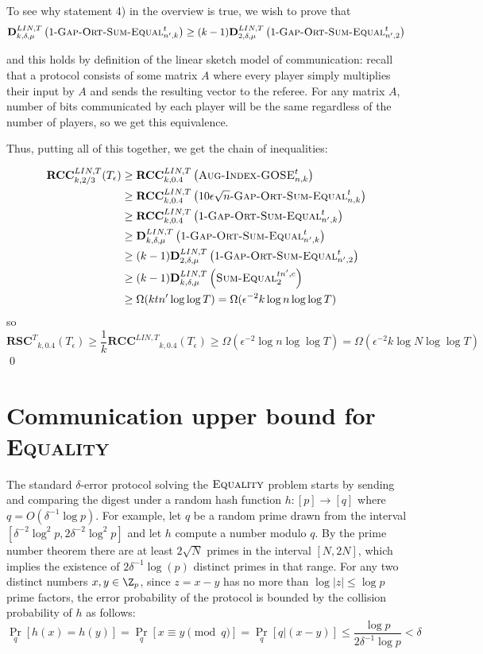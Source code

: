 \documentclass{toc}
\newcommand{\error}{\ensuremath{\delta}}
\newcommand{\bigo}[1]{\ensuremath{{{O} \left( {#1} \right)}}}
\newcommand{\rscT}{\ensuremath{\mathbf{RSC}^T}}
\newcommand{\rcclinT}{\ensuremath{\mathbf{RCC}^{LIN,T}}}
\newcommand{\DlinT}{\ensuremath{\mathbf{D}^{LIN,T}}}
\newcommand{\sumequal}{\textsc{Sum-Equal} }
\newcommand{\gose}{\textsc{Gap-Ort-Sum-Equal}}
\newcommand{\auggo}{\textsc{Aug-Index-GOSE}}
\begin{document}
	{\color{black} To see why statement 4) in the overview is true, we wish to prove that
	$$ \DlinT_{k,\delta,\mu}\left(1\text{-}\gose_{n',k}^t\right)\ge (k-1) \DlinT_{2,\delta,\mu}\left(1\text{-}\gose_{n',2}^t\right)$$
	
	and this holds by definition of the linear sketch model of communication: recall that a protocol consists of some matrix $A$ where every player simply multiplies their input by $A$ and sends the resulting vector to the referee. For any matrix $A$, number of bits communicated by each player will be the same regardless of the number of players, so we get this equivalence.} %
	
	Thus, {\color{black} putting all of this together, we get the chain of inequalities:}
	
	\begin{align*}
	\rcclinT_{k,2/3}(T_\epsilon) &\ge \rcclinT_{k,0.4}\left( \auggo_{n,k}^{t} \right)\\
	&\ge \rcclinT_{k,0.4}\left(10\epsilon\sqrt{n}\text{-}\gose_{n,k}^t\right)\\
	&\ge \rcclinT_{k,0.4}\left(1\text{-}\gose_{n',k}^t\right)\\
	&\ge \DlinT_{k,\delta,\mu}\left(1\text{-}\gose_{n',k}^t\right)\\
	&\ge (k-1) \DlinT_{2,\delta,\mu}\left(1\text{-}\gose_{n',2}^t\right)\\
	&\ge (k-1) \DlinT_{k,\delta,\mu}\left(\sumequal_{2}^{tn',c}\right)\\
	&\ge \Omega(ktn' \log \log T) = \Omega(\epsilon^{-2} k\log n \log \log T)
	\end{align*}
	so
	$$\rscT_{k,0.4}(T_\epsilon) \ge \frac{1}{k} \rcclinT_{k,0.4}(T_\epsilon) \ge \Omega(\epsilon^{-2} \log n \log \log T) = \Omega(\epsilon^{-2} k \log N \log \log T)$$
	\qed

\appendix

%


\section{Communication upper bound for \textsc{Equality}}
\label{sec:testing equality}


The standard $\error$-error protocol solving the $\textsc{Equality}$ problem starts by sending and comparing the digest under a random hash function $h:[p]\to [q]$ where $q=\bigo{\error^{-1}\log p}$. 
For example, let $q$ be a random prime drawn from the interval $[\error^{-2}\log^2 p, 2\error^{-2}\log^2 p]$ and let $h$ compute a number modulo $q$.
By the prime number theorem there are at least $2\sqrt{N}$ primes in the interval $[N,2N]$, 
which implies the existence of $2\error^{-1}\log(p)$ distinct primes in that range. 
%
For any two distinct numbers $x,y\in \Z_p$,  since $z=x-y$ has no more than $\log|z|\le \log p$ prime factors, the error probability of the protocol is bounded by the collision probability of $h$ as follows:
%
\[
\Pr_q\left[h(x)= h(y) \right]=\Pr_q\left[x\equiv y \pmod q \right]=\Pr_q\left[q | (x-y) \right] \le \frac{\log p}{2\error^{-1}\log p} <\error
\]
%
\end{document}
